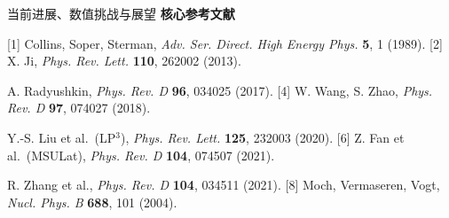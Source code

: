 \documentclass[10pt,aspectratio=169]{beamer}
\begin{document}
\begin{frame}{当前进展、数值挑战与展望}
  \begingroup\scriptsize
  \textbf{核心参考文献}\par\vspace{1pt}
  [1] Collins, Soper, Sterman, \textit{Adv. Ser. Direct. High Energy Phys.} \textbf{5}, 1 (1989).
  \hspace{1.5em} [2] X. Ji, \textit{Phys. Rev. Lett.} \textbf{110}, 262002 (2013).\par
  [3] A. Radyushkin, \textit{Phys. Rev. D} \textbf{96}, 034025 (2017).
  \hspace{1.5em} [4] W. Wang, S. Zhao, \textit{Phys. Rev. D} \textbf{97}, 074027 (2018).\par
  [5] Y.-S. Liu et al.\ (LP$^3$), \textit{Phys. Rev. Lett.} \textbf{125}, 232003 (2020).
  \hspace{1.5em} [6] Z. Fan et al.\ (MSULat), \textit{Phys. Rev. D} \textbf{104}, 074507 (2021).\par
  [7] R. Zhang et al., \textit{Phys. Rev. D} \textbf{104}, 034511 (2021).
  \hspace{1.5em} [8] Moch, Vermaseren, Vogt, \textit{Nucl. Phys. B} \textbf{688}, 101 (2004).\par
  \endgroup\vspace{-12pt}
\end{frame}
\end{document}
